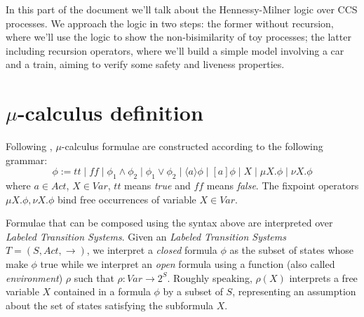 In this part of the document we'll talk about the Hennessy-Milner
logic over CCS processes. We approach the logic in two steps: the
former without recursion, where we'll use the logic to show the
non-bisimilarity of toy processes; the latter including recursion
operators, where we'll build a simple model involving a car and a
train, aiming to verify some safety and liveness properties.

\section{$\mu$-calculus definition}
Following \cite{MuScSt1999}, $\mu$-calculus formulae are constructed
according to the following grammar:
\begin{displaymath}
  \phi := tt \mid ff \mid \phi_1 \wedge \phi_2 \mid \phi_1 \vee \phi_2 \mid
  \langle a \rangle \phi \mid [a]\phi \mid X \mid \mu X.\phi
  \mid \nu X.\phi
\end{displaymath}
where $a \in Act$, $X \in Var$, $tt$ means \emph{true} and $ff$ means
\emph{false}. The fixpoint operators $\mu X.\phi, \nu X.\phi$ bind
free occurrences of variable $X \in Var$.

Formulae that can be composed using the syntax above are interpreted
over \emph{Labeled Transition Systems}. Given an \emph{Labeled
  Transition Systems} $T = (S, Act, \rightarrow)$, we interpret a
\emph{closed} formula $\phi$ as the subset of states whose make $\phi$
true while we interpret an \emph{open} formula using a function (also
called \emph{environment}) $\rho$ such that $\rho: Var \rightarrow
2^S$. Roughly speaking, $\rho(X)$ interprets a free variable $X$
contained in a formula $\phi$ by a subset of $S$, representing an
assumption about the set of states satisfying the subformula $X$.

